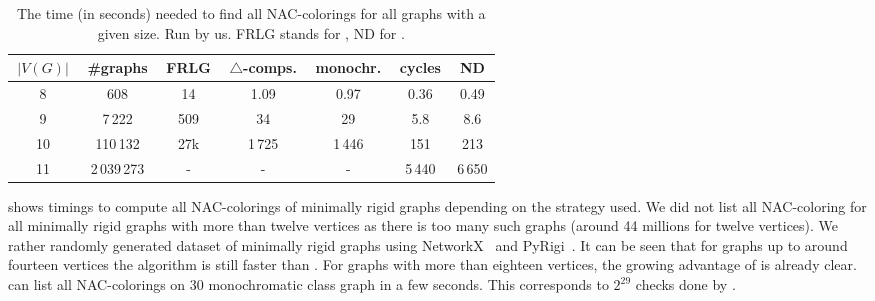 \begin{table}[ht]
	\caption[Running times on graphs]{
		The time (in seconds) needed to find all NAC-colorings for all graphs with a given size. Run by us.
		\textsc{FRLG} stands for \flexrilog{}, \textsc{ND} for \NeighborsDegree{}.}%
	\label{tab:all_min_rigid}
	\vspace{0.3cm}
	\centering
	\begin{tabular}{ccccccc}
		\hline
		\,$|V(G)|$\, & \,\#graphs\, & \,FRLG\, & \,$\triangle$-comps.\, & \,monochr.\, & \,cycles\, & \,\textsc{ND}\, \\
		\hline
		8            & 608          & 14       & 1.09                   & 0.97         & 0.36       & 0.49            \\
		9            & 7\,222       & 509      & 34                     & 29           & 5.8        & 8.6             \\
		10           & 110\,132     & 27k      & 1\,725                 & 1\,446       & 151        & 213             \\
		11           & 2\,039\,273  & -        & -                      & -            & 5\,440     & 6\,650          \\
		\hline
	\end{tabular}
\end{table}

shows timings to compute all NAC-colorings of minimally rigid graphs
depending on the strategy used.
We did not list all NAC-coloring for all minimally rigid graphs with more than twelve vertices
as there is too many such graphs (around 44 millions for twelve vertices).
%
We rather randomly generated dataset of minimally rigid graphs
using NetworkX~\cite{networkx} and PyRigi~\cite{pyrigi}.
%
It can be seen that for graphs up to around fourteen vertices the \NaiveCycles{} algorithm
is still faster than \Subgraphs{}.
For graphs with more than eighteen vertices,
the growing advantage of \Subgraphs{} is already clear.
\Subgraphs{} can list all NAC-colorings on 30 monochromatic class graph in a few seconds.
This corresponds to \( 2^{29} \) checks done by \NaiveCycles{}.

